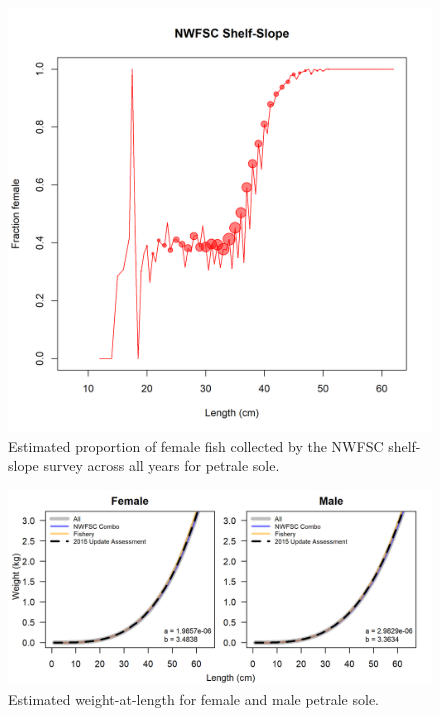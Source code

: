 \documentclass[12pt,]{article}
\begin{document}
\begin{figure}
\centering
\includegraphics{Figures/NWFSC Shelf-Slope_length_fraction_female.png}
\caption{Estimated proportion of female fish collected by the NWFSC
shelf-slope survey across all years for petrale sole.
\label{fig:sex_ratio}}
\end{figure}

\begin{figure}
\centering
\includegraphics{Figures/weightAtLengthPred.png}
\caption{Estimated weight-at-length for female and male petrale sole.
\label{fig:wt_length}}
\end{figure}
\end{document}
